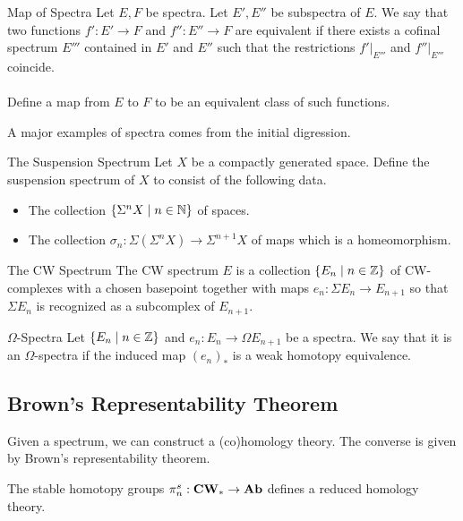 \documentclass[a4paper]{article}
\begin{document}
\begin{defn}{Map of Spectra}{} Let $E,F$ be spectra. Let $E',E''$ be subspectra of $E$. We say that two functions $f':E'\to F$ and $f'':E''\to F$ are equivalent if there exists a cofinal spectrum $E'''$ contained in $E'$ and $E''$ such that the restrictions $f'|_{E'''}$ and $f''|_{E'''}$ coincide. \\~\\

Define a map from $E$ to $F$ to be an equivalent class of such functions. 
\end{defn}


A major examples of spectra comes from the initial digression. 

\begin{defn}{The Suspension Spectrum}{} Let $X$ be a compactly generated space. Define the suspension spectrum of $X$ to consist of the following data. 
\begin{itemize}
\item The collection $\{\Sigma^n X\;|\;n\in\mathbb{N}\}$ of spaces. 
\item The collection $\sigma_n:\Sigma(\Sigma^nX)\to\Sigma^{n+1}X$ of maps which is a homeomorphism. 
\end{itemize}
\end{defn}

\begin{defn}{The CW Spectrum}{} The CW spectrum $E$ is a collection $\{E_n\;|\;n\in\mathbb{Z}\}$ of CW-complexes with a chosen basepoint together with maps $e_n:\Sigma E_n\to E_{n+1}$ so that $\Sigma E_n$ is recognized as a subcomplex of $E_{n+1}$. 
\end{defn}

\begin{defn}{$\Omega$-Spectra}{} Let $\{E_n\;|\;n\in\mathbb{Z}\}$ and $e_n:E_n\to\Omega E_{n+1}$ be a spectra. We say that it is an $\Omega$-spectra if the induced map $(e_n)_\ast$ is a weak homotopy equivalence. 
\end{defn}

\subsection{Brown's Representability Theorem}
Given a spectrum, we can construct a (co)homology theory. The converse is given by Brown's representability theorem. 

\begin{thm}{}{} The stable homotopy groups $\pi_n^s:\bold{CW}_\ast\to\bold{Ab}$ defines a reduced homology theory. 
\end{thm}
\end{document}

